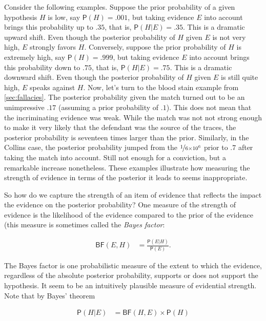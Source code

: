 \documentclass[10pt,dvipsnames,enabledeprecatedfontcommands]{scrartcl}
\newcommand{\pr}[1]{\mathsf{P}(#1)}
\begin{document}
Consider the following examples. Suppose the prior probability of a
given hypothesis \(H\) is low, say \(\pr{H}=.001\), but taking evidence
\(E\) into account brings this probability up to \(.35\), that is,
\(\pr{H \vert E}=.35\). This is a dramatic upward shift. Even though the
posterior probability of \(H\) given \(E\) is not very high, \(E\)
strongly favors \(H\). Conversely, suppose the prior probability of
\(H\) is extremely high, say \(\pr{H}=.999\), but taking evidence \(E\)
into account brings this probability down to \(.75\), that is,
\(\pr{H \vert E}=.75\). This is a dramatic downward shift. Even though
the posterior probability of \(H\) given \(E\) is still quite high,
\(E\) speaks against \(H\). Now, let's turn to the blood stain example
from \ref{sec:fallacies}. The posterior probability
given the match turned out to be an unimpressive \(.17\) (assuming a
prior probability of \(.1\)). This does not mean that the incriminating
evidence was weak. While the match was not not strong enough to make it
very likely that the defendant was the source of the traces, the
posterior probability is seventeen times larger than the prior.
Similarly, in the Collins case, the posterior probability jumped from
the \(\nicefrac{1}{6 \times 10^6}\) prior to \(.7\) after taking the
match into account. Still not enough for a conviction, but a remarkable
increase nonetheless. These examples illustrate how measuring the
strength of evidence in terms of the posterior it leads to seems
inappropriate.

So how do we capture the strength of an item of evidence that reflects
the impact the evidence on the posterior probability? One measure of the
strength of evidence is the likelihood of the evidence compared to the
prior of the evidence (this measure is sometimes called the
\emph{Bayes factor}:

\begin{align}\label{eq:BF}
\tag{BF}
\mathsf{BF}(E,H) & = \frac{\pr{E \vert H}}{\pr{E}}.
\end{align}

\noindent The Bayes factor is one probabilistic measure of the extent to
which the evidence, regardless of the absolute posterior probability,
supports or does not support the hypothesis. It seem to be an
intuitively plausible measure of evidential strength. Note that by
Bayes' theorem

\vspace{-3mm}

\begin{align*}
\pr{H \vert E} & = \mathsf{BF}(H, E) \times \pr{H}
\end{align*}
\end{document}
